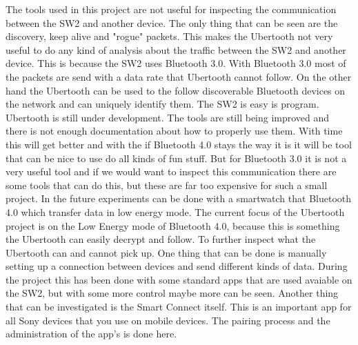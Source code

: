 The tools used in this project are not useful for inspecting the communication between the SW2 and another device. The only thing that can be seen are the discovery, keep alive and  "rogue" packets. This makes the Ubertooth not very useful to do any kind of analysis about the traffic between the SW2 and another device. This is because the SW2 uses Bluetooth 3.0. With Bluetooth 3.0  most of the packets are send with a data rate that Ubertooth cannot follow. \pend  On the other hand the Ubertooth can be used to the follow discoverable Bluetooth devices on the network and can uniquely identify them. The SW2 is easy is program. 
Ubertooth is still under development. The tools are still being improved and there is not enough documentation about how to properly use them. With time this will get better and with the if Bluetooth 4.0 stays the way it is it will be tool that can be nice to use do all kinds of fun stuff. But for Bluetooth 3.0 it is not a very useful tool and if we would want to inspect this communication there are some tools that can do this, but these are far too expensive for such a small project.
\pend
In the future experiments can be done with a smartwatch that Bluetooth 4.0 which transfer data in low energy mode. The current focus of the Ubertooth project is on the Low Energy mode of Bluetooth 4.0, because this is something the Ubertooth can easily decrypt and follow. 
To further inspect what the Ubertooth can and cannot pick up. One thing that can be done is manually setting up a connection between devices and send different kinds of data. During the project this has been done with some standard apps that are used avaiable on the SW2, but with some more control maybe more can be seen. \pend
Another thing that can be investigated is the Smart Connect itself. This is an important app for all Sony devices that you use on mobile devices. The pairing process and the administration of the app's is done here. \pend
